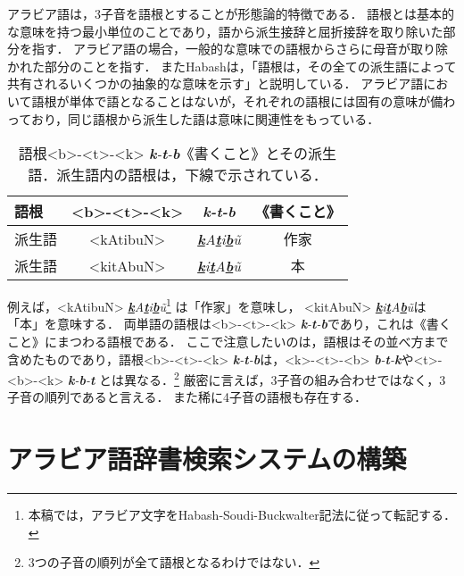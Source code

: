 \documentclass[technicalreport]{ieicej}
\begin{document}
アラビア語は，3子音を語根とすることが形態論的特徴である．
語根とは基本的な意味を持つ最小単位のことであり，語から派生接辞と屈折接辞を取り除いた部分を指す\cite{nishihara2012}．
アラビア語の場合，一般的な意味での語根からさらに母音が取り除かれた部分のことを指す．
またHabash\cite{habash2010}は，「語根は，その全ての派生語によって共有されるいくつかの抽象的な意味を示す」と説明している．
アラビア語において語根が単体で語となることはないが，それぞれの語根には固有の意味が備わっており，同じ語根から派生した語は意味に関連性をもっている．

\begin{table}[ht]
\begin{center}
\begin{tabular}{l|ccc}
   語根& <b>-<t>-<k> & \textit{\textbf{k}-\textbf{t}-\textbf{b}} & 《書くこと》\\
  \hline
 派生語& <kAtibuN> & \textit{\underline{\textbf{k}}A\underline{\textbf{t}}i\underline{\textbf{b}}\~u} & 作家\\
  派生語& <kitAbuN> & \textit{\underline{\textbf{k}}i\underline{\textbf{t}}A\underline{\textbf{b}}\~u} & 本\\
\hline
\end{tabular}
\caption{語根<b>-<t>-<k> \textit{\textbf{k}-\textbf{t}-\textbf{b}}《書くこと》とその派生語．派生語内の語根は，下線で示されている．}
\label{table:alignment}
\end{center}
\end{table}

例えば，<kAtibuN> \textit{\underline{\textbf{k}}A\underline{\textbf{t}}i\underline{\textbf{b}}\~u}\footnote{本稿では，アラビア文字をHabash-Soudi-Buckwalter記法に従って転記する．} は「作家」を意味し， <kitAbuN> \textit{\underline{\textbf{k}}i\underline{\textbf{t}}A\underline{\textbf{b}}\~u}は「本」を意味する．
両単語の語根は<b>-<t>-<k> \textit{\textbf{k}-\textbf{t}-\textbf{b}}であり，これは《書くこと》にまつわる語根である．
ここで注意したいのは，語根はその並べ方まで含めたものであり，語根<b>-<t>-<k> \textit{\textbf{k}-\textbf{t}-\textbf{b}}は，<k>-<t>-<b> \textit{\textbf{b}-\textbf{t}-\textbf{k}}や<t>-<b>-<k> \textit{\textbf{k}-\textbf{b}-\textbf{t}} とは異なる．\footnote{3つの子音の順列が全て語根となるわけではない．}
厳密に言えば，3子音の組み合わせではなく，3子音の順列であると言える．
また稀に4子音の語根も存在する．

\section{アラビア語辞書検索システムの構築}
\end{document}
